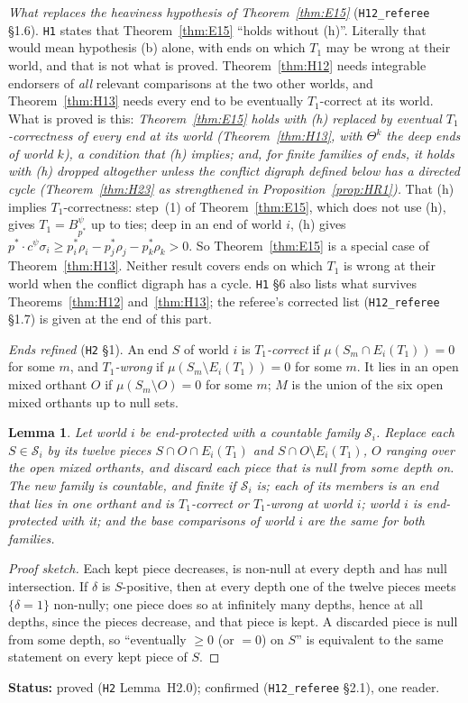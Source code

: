 \documentclass[11pt]{article}
\newtheorem{lemma}[theorem]{Lemma}
\theoremstyle{definition}
\theoremstyle{remark}
\newcommand{\src}[1]{\texttt{#1}}
\newcommand{\status}[1]{\par\smallskip\noindent\textbf{Status:} #1\par\smallskip}
\begin{document}
\emph{What replaces the heaviness hypothesis of Theorem~\ref{thm:E15}} (\src{H12\_referee} \S1.6). \src{H1} states that Theorem~\ref{thm:E15} ``holds without (h)''. Literally that would mean hypothesis (b) alone, with ends on which $T_1$ may be wrong at their world, and that is not what is proved. Theorem~\ref{thm:H12} needs integrable endorsers of \emph{all} relevant comparisons at the two other worlds, and Theorem~\ref{thm:H13} needs every end to be eventually $T_1$-correct at its world. What is proved is this: \emph{Theorem~\ref{thm:E15} holds with (h) replaced by eventual $T_1$-correctness of every end at its world (Theorem~\ref{thm:H13}, with $\Theta^k$ the deep ends of world $k$), a condition that (h) implies; and, for finite families of ends, it holds with (h) dropped altogether unless the conflict digraph defined below has a directed cycle (Theorem~\ref{thm:H23} as strengthened in Proposition~\ref{prop:HR1}).} That (h) implies $T_1$-correctness: step~(1) of Theorem~\ref{thm:E15}, which does not use (h), gives $T_1=B^\psi_{p^*}$ up to ties; deep in an end of world $i$, (h) gives $p^*\cdot c^\psi\sigma_i\ge p^*_i\rho_i-p^*_j\rho_j-p^*_k\rho_k>0$. So Theorem~\ref{thm:E15} is a special case of Theorem~\ref{thm:H13}. Neither result covers ends on which $T_1$ is wrong at their world when the conflict digraph has a cycle. \src{H1} \S6 also lists what survives Theorems~\ref{thm:H12} and~\ref{thm:H13}; the referee's corrected list (\src{H12\_referee} \S1.7) is given at the end of this part.

\emph{Ends refined} (\src{H2} \S1). An end $S$ of world $i$ is \emph{$T_1$-correct} if $\mu(S_m\cap E_i(T_1))=0$ for some $m$, and \emph{$T_1$-wrong} if $\mu(S_m\setminus E_i(T_1))=0$ for some $m$. It lies in an open mixed orthant $O$ if $\mu(S_m\setminus O)=0$ for some $m$; $M$ is the union of the six open mixed orthants up to null sets.

\begin{lemma}\label{lem:H20}
Let world $i$ be end-protected with a countable family $\mathcal S_i$. Replace each $S\in\mathcal S_i$ by its twelve pieces $S\cap O\cap E_i(T_1)$ and $S\cap O\setminus E_i(T_1)$, $O$ ranging over the open mixed orthants, and discard each piece that is null from some depth on. The new family is countable, and finite if $\mathcal S_i$ is; each of its members is an end that lies in one orthant and is $T_1$-correct or $T_1$-wrong at world $i$; world $i$ is end-protected with it; and the base comparisons of world $i$ are the same for both families.
\end{lemma}
\begin{proof}[Proof sketch]
Each kept piece decreases, is non-null at every depth and has null intersection. If $\delta$ is $S$-positive, then at every depth one of the twelve pieces meets $\{\delta=1\}$ non-nully; one piece does so at infinitely many depths, hence at all depths, since the pieces decrease, and that piece is kept. A discarded piece is null from some depth, so ``eventually $\ge0$ (or $=0$) on $S$'' is equivalent to the same statement on every kept piece of $S$.
\end{proof}
\status{proved (\src{H2} Lemma~H2.0); confirmed (\src{H12\_referee} \S2.1), one reader.}
\end{document}
